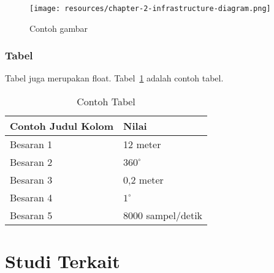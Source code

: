     \begin{figure}[h]
        \centering
        \texttt{[image: resources/chapter-2-infrastructure-diagram.png]}
        \caption{Contoh gambar}
        \label{fig:contoh_gambar}
    \end{figure}

    \subsubsection{Tabel}

    Tabel juga merupakan float. Tabel~\ref{table:contoh_tabel} adalah contoh tabel.

    \begin{table}[htbp]
        \small
        \centering
        \caption{Contoh Tabel}
        \label{table:contoh_tabel}
        \begin{tabular}{ll}
            \toprule
            \multicolumn{1}{l}{\textbf{Contoh Judul Kolom}} & \multicolumn{1}{l}{\textbf{Nilai}}\\
            \midrule
            Besaran 1 & 12 meter          \\
            Besaran 2 & $360^\circ$       \\
            Besaran 3 & 0,2 meter         \\
            Besaran 4 & $1^\circ$         \\
            Besaran 5 & 8000 sampel/detik \\
            \bottomrule
        \end{tabular}
    \end{table}

\section{Studi Terkait}
\blindtext
